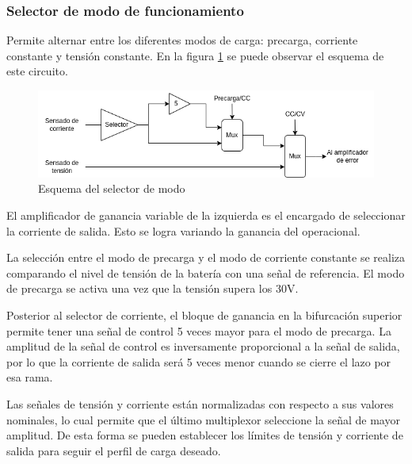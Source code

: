 
\subsubsection{Selector de modo de funcionamiento}

Permite alternar entre los diferentes modos de carga: precarga, corriente constante y tensión constante. 
En la figura \ref{fig:esquema_selector} se puede observar el esquema de este circuito.

\begin{figure}[H]
    \centering
    \includegraphics[width=\textwidth]{images/selector.png}
    \caption{Esquema del selector de modo}
    \label{fig:esquema_selector}
\end{figure}

El amplificador de ganancia variable de la izquierda es el encargado de seleccionar la corriente de salida.
Esto se logra variando la ganancia del operacional.

La selección entre el modo de precarga y el modo de corriente constante se realiza comparando el nivel de tensión de la batería con una señal de referencia.
El modo de precarga se activa una vez que la tensión supera los 30V.

Posterior al selector de corriente, el bloque de ganancia en la bifurcación superior permite tener una señal de control 5 veces mayor para el modo de precarga.
La amplitud de la señal de control es inversamente proporcional a la señal de salida,
por lo que la corriente de salida será 5 veces menor cuando se cierre el lazo por esa rama.

Las señales de tensión y corriente están normalizadas con respecto a sus valores nominales, lo cual permite que el último multiplexor seleccione la señal de mayor amplitud. De esta forma se pueden establecer los límites de tensión y corriente de salida para seguir el perfil de carga deseado.

